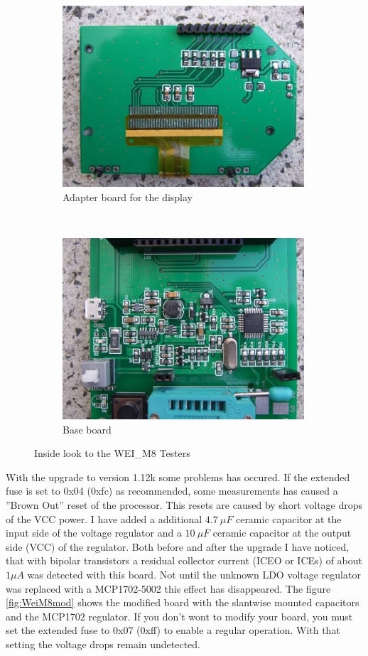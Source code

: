 \begin{figure}[H]
  \begin{subfigure}[b]{9cm}
    \centering
    \includegraphics[width=9cm]{../PNG/WEI_M8_D.JPG}
    \caption{Adapter board for the display}
  \end{subfigure}
  ~
  \begin{subfigure}[b]{9cm}
    \centering
    \includegraphics[width=9cm]{../PNG/WEI_M8_L.JPG}
    \caption{Base board}
  \end{subfigure}
  \caption{Inside look to the WEI\_M8 Testers}
  \label{fig:WeiM8int}
\end{figure}

With the upgrade to version 1.12k some problems has occured.
If the extended fuse is set to 0x04 (0xfc) as recommended, some measurements has
caused a ''Brown Out'' reset of the processor.
This resets are caused by short voltage drops of the VCC power.
I have added a additional \(4.7~\mu F\) ceramic capacitor at the input side of
the voltage regulator and a \(10~\mu F\) ceramic capacitor at the output side (VCC)
of the regulator.
Both before and after the upgrade I have noticed, that with bipolar transistors
a residual collector current (ICEO or ICEs) of about \(1\mu A\) was detected with this board.
Not until the unknown LDO voltage regulator was replaced with a MCP1702-5002 this
effect has disappeared. The figure \ref{fig:WeiM8mod} shows the modified board with
the slantwise mounted capacitors and the MCP1702 regulator.
If you don't wont to modify your board, you must set the extended fuse to 0x07 (0xff)
to enable a regular operation. With that setting the voltage drops remain undetected.

